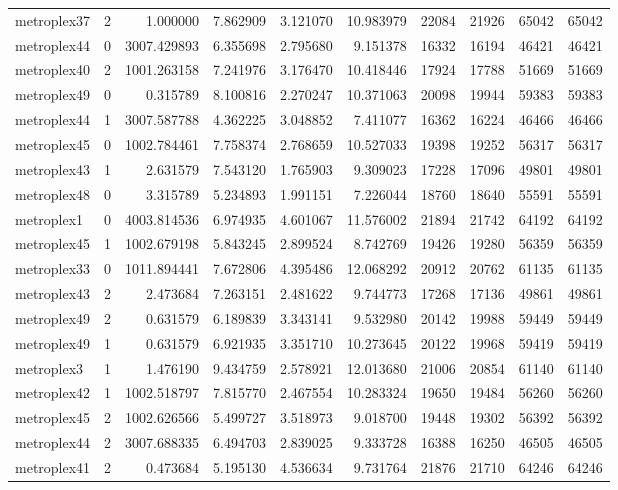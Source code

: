 \begin{longtable}{|l|r|r|r|r|r|r|r|r|r|}
metroplex37 & 2 & 1.000000 & 7.862909 & 3.121070 & 10.983979 & 22084 & 21926 & 65042 & 65042 \\
metroplex44 & 0 & 3007.429893 & 6.355698 & 2.795680 & 9.151378 & 16332 & 16194 & 46421 & 46421 \\
metroplex40 & 2 & 1001.263158 & 7.241976 & 3.176470 & 10.418446 & 17924 & 17788 & 51669 & 51669 \\
metroplex49 & 0 & 0.315789 & 8.100816 & 2.270247 & 10.371063 & 20098 & 19944 & 59383 & 59383 \\
metroplex44 & 1 & 3007.587788 & 4.362225 & 3.048852 & 7.411077 & 16362 & 16224 & 46466 & 46466 \\
metroplex45 & 0 & 1002.784461 & 7.758374 & 2.768659 & 10.527033 & 19398 & 19252 & 56317 & 56317 \\
metroplex43 & 1 & 2.631579 & 7.543120 & 1.765903 & 9.309023 & 17228 & 17096 & 49801 & 49801 \\
metroplex48 & 0 & 3.315789 & 5.234893 & 1.991151 & 7.226044 & 18760 & 18640 & 55591 & 55591 \\
metroplex1 & 0 & 4003.814536 & 6.974935 & 4.601067 & 11.576002 & 21894 & 21742 & 64192 & 64192 \\
metroplex45 & 1 & 1002.679198 & 5.843245 & 2.899524 & 8.742769 & 19426 & 19280 & 56359 & 56359 \\
metroplex33 & 0 & 1011.894441 & 7.672806 & 4.395486 & 12.068292 & 20912 & 20762 & 61135 & 61135 \\
metroplex43 & 2 & 2.473684 & 7.263151 & 2.481622 & 9.744773 & 17268 & 17136 & 49861 & 49861 \\
metroplex49 & 2 & 0.631579 & 6.189839 & 3.343141 & 9.532980 & 20142 & 19988 & 59449 & 59449 \\
metroplex49 & 1 & 0.631579 & 6.921935 & 3.351710 & 10.273645 & 20122 & 19968 & 59419 & 59419 \\
metroplex3 & 1 & 1.476190 & 9.434759 & 2.578921 & 12.013680 & 21006 & 20854 & 61140 & 61140 \\
metroplex42 & 1 & 1002.518797 & 7.815770 & 2.467554 & 10.283324 & 19650 & 19484 & 56260 & 56260 \\
metroplex45 & 2 & 1002.626566 & 5.499727 & 3.518973 & 9.018700 & 19448 & 19302 & 56392 & 56392 \\
metroplex44 & 2 & 3007.688335 & 6.494703 & 2.839025 & 9.333728 & 16388 & 16250 & 46505 & 46505 \\
metroplex41 & 2 & 0.473684 & 5.195130 & 4.536634 & 9.731764 & 21876 & 21710 & 64246 & 64246 \\

\end{longtable}
